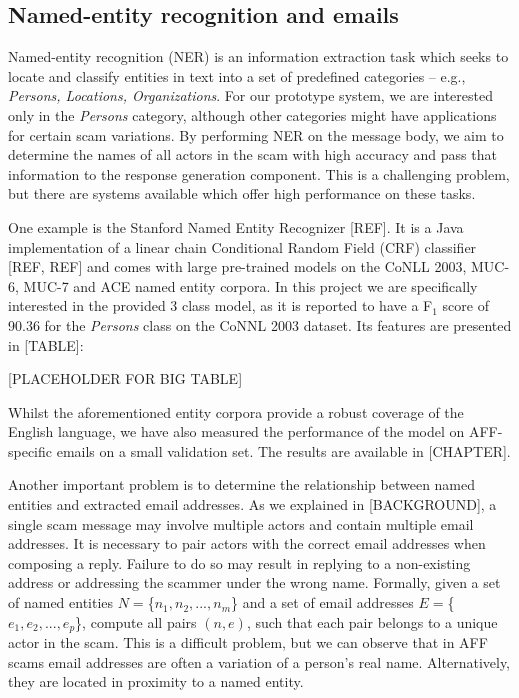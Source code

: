 \subsection{Named-entity recognition and emails}
Named-entity recognition (NER) is an information extraction task which seeks to locate and classify entities in text into a set of predefined categories -- e.g., \textit{Persons, Locations, Organizations}. For our prototype system, we are interested only in the \emph{Persons} category, although other categories might have applications for certain scam variations.  By performing NER on the message body, we aim to determine the names of all actors in the scam with high accuracy and pass that information to the response generation component. This is a challenging problem, but there are systems available which offer high performance on these tasks.

One example is the Stanford Named Entity Recognizer [REF]. It is a Java implementation of a linear chain Conditional Random Field (CRF) classifier [REF, REF] and comes with large pre-trained models on the CoNLL 2003, MUC-6, MUC-7 and ACE named entity corpora. In this project we are specifically interested in the provided 3 class model, as it is reported to have a F$_{1}$ score of 90.36 for the \emph{Persons} class on the CoNNL 2003 dataset. Its features are presented in [TABLE]:

[PLACEHOLDER FOR BIG TABLE]

Whilst the aforementioned entity corpora provide a robust coverage of the English language, we have also measured the performance of the model on AFF-specific emails on a small validation set. The results are available in [CHAPTER]. 

Another important problem is to determine the relationship between named entities and extracted email addresses. As we explained in [BACKGROUND], a single scam message may involve multiple actors and contain multiple email addresses. It is necessary to pair actors with the correct email addresses when composing a reply. Failure to do so may result in replying to a non-existing address or addressing the scammer under the wrong name. Formally, given a set of named entities $N = $\{$n_{1}, n_{2},...,n_{m}$\} and a set of email addresses $E = $\{$e_{1}, e_{2},...,e_{p}$\}, compute all pairs $(n, e)$, such that each pair belongs to a unique actor in the scam. This is a difficult problem, but we can observe that in AFF scams email addresses are often a variation of a person's real name. Alternatively, they are located in proximity to a named entity.


